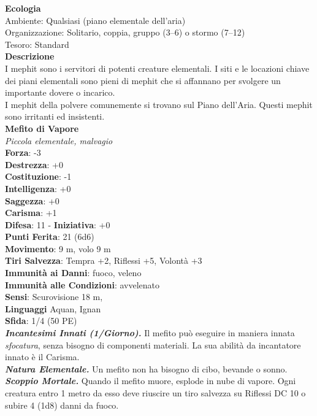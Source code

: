 \begin{multicols}{2}
\textbf{Ecologia}\\
Ambiente: Qualsiasi (piano elementale dell'aria)\\
Organizzazione: Solitario, coppia, gruppo (3–6) o stormo (7–12)\\
Tesoro: Standard\\
\textbf{Descrizione}\\
I mephit sono i servitori di potenti creature elementali. I siti e le locazioni chiave dei piani elementali sono pieni di mephit che si affannano per svolgere un importante dovere o incarico.\\
I mephit della polvere comunemente si trovano sul Piano dell'Aria. Questi mephit sono irritanti ed insistenti.\\


\medskip\textbf{Mefito di Vapore}\\
\emph{Piccola elementale, malvagio}\\
\textbf{Forza}: -3\\
\textbf{Destrezza}: +0\\
\textbf{Costituzione}: -1\\
\textbf{Intelligenza}: +0\\
\textbf{Saggezza}: +0\\
\textbf{Carisma}: +1\\
\textbf{Difesa}: 11 - \textbf{Iniziativa}: +0\\
\textbf{Punti Ferita}: 21 (6d6)\\
\textbf{Movimento}: 9 m, volo 9 m\\
\textbf{Tiri Salvezza}: Tempra +2, Riflessi +5, Volontà +3\\
\textbf{Immunità ai Danni}: fuoco, veleno\\
\textbf{Immunità alle Condizioni}: avvelenato\\
\textbf{Sensi}: Scurovisione 18 m, \\
\textbf{Linguaggi} Aquan, Ignan\\
\textbf{Sfida}: 1/4 (50 PE)\smallskip\\
\emph{\textbf{Incantesimi Innati (1/Giorno).}} Il mefito può eseguire in maniera innata \emph{sfocatura}, senza bisogno di componenti materiali. La sua abilità da incantatore innato è il Carisma.\\
\emph{\textbf{Natura Elementale.}} Un mefito non ha bisogno di cibo, bevande o sonno.\\
\emph{\textbf{Scoppio Mortale.}} Quando il mefito muore, esplode in nube di vapore. Ogni creatura entro 1 metro da esso deve riuscire un tiro salvezza su Riflessi DC 10 o subire 4 (1d8) danni da fuoco. \\

\end{multicols}

